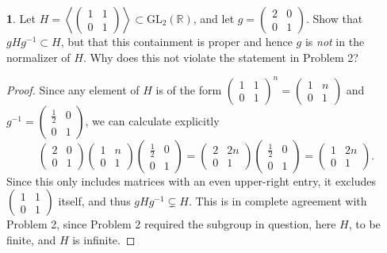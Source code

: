\documentclass[12pt]{article}
\theoremstyle{definition}
\newtheorem{ex}{}
\begin{document}
\begin{ex}
	Let $H = \left\langle \begin{pmatrix}1 & 1 \\ 0 & 1\end{pmatrix} \right\rangle \subset \mathrm{GL}_2(\mathbb{R})$, and let $g = \begin{pmatrix}2 & 0 \\ 0 & 1\end{pmatrix}$.
	Show that $gHg^{-1} \subset H$, but that this containment is proper and hence $g$ is \textit{not} in the normalizer of $H$.
	Why does this not violate the statement in Problem 2?
\end{ex}
\begin{proof}
	Since any element of $H$ is of the form $\begin{pmatrix}1 & 1 \\ 0 & 1\end{pmatrix}^n = \begin{pmatrix}1 & n \\ 0 & 1\end{pmatrix}$ and $g^{-1} = \begin{pmatrix}\frac{1}{2} & 0 \\ 0 & 1\end{pmatrix}$, we can calculate explicitly \begin{equation*}
		\begin{pmatrix}2 & 0 \\ 0 & 1\end{pmatrix} \begin{pmatrix} 1 & n \\ 0 & 1\end{pmatrix} \begin{pmatrix}\frac{1}{2} & 0 \\ 0 & 1\end{pmatrix} = \begin{pmatrix}2 & 2n \\ 0 & 1\end{pmatrix}\begin{pmatrix}\frac{1}{2} & 0 \\ 0 & 1\end{pmatrix} = \begin{pmatrix}1 & 2n \\ 0 & 1\end{pmatrix}.
	\end{equation*}
	Since this only includes matrices with an even upper-right entry, it excludes $\begin{pmatrix}1 & 1 \\ 0 & 1\end{pmatrix}$ itself, and thus $gHg^{-1} \subsetneq H$.
	This is in complete agreement with Problem 2, since Problem 2 required the subgroup in question, here $H$, to be finite, and $H$ is infinite.
\end{proof}
\end{document}
